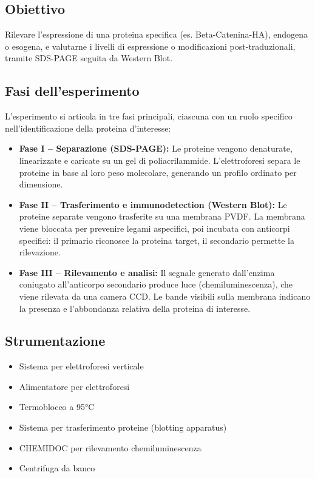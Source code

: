 \subsection{Obiettivo}
Rilevare l'espressione di una proteina specifica (es. Beta-Catenina-HA), endogena o esogena, e valutarne i livelli di espressione o modificazioni post-traduzionali, tramite SDS-PAGE seguita da Western Blot.

\subsection{Fasi dell’esperimento}

L’esperimento si articola in tre fasi principali, ciascuna con un ruolo specifico nell’identificazione della proteina d’interesse:

\begin{itemize}
  \item \textbf{Fase I – Separazione (SDS-PAGE):}  
  Le proteine vengono denaturate, linearizzate e caricate su un gel di poliacrilammide. L’elettroforesi separa le proteine in base al loro peso molecolare, generando un profilo ordinato per dimensione.

  \item \textbf{Fase II – Trasferimento e immunodetection (Western Blot):}  
  Le proteine separate vengono trasferite su una membrana PVDF. La membrana viene bloccata per prevenire legami aspecifici, poi incubata con anticorpi specifici: il primario riconosce la proteina target, il secondario permette la rilevazione.

  \item \textbf{Fase III – Rilevamento e analisi:}  
  Il segnale generato dall’enzima coniugato all’anticorpo secondario produce luce (chemiluminescenza), che viene rilevata da una camera CCD. Le bande visibili sulla membrana indicano la presenza e l’abbondanza relativa della proteina di interesse.
\end{itemize}

\newpage
\subsection{Strumentazione}
\begin{itemize}
  \item Sistema per elettroforesi verticale
  \item Alimentatore per elettroforesi
  \item Termoblocco a 95°C
  \item Sistema per trasferimento proteine (blotting apparatus)
  \item CHEMIDOC per rilevamento chemiluminescenza
  \item Centrifuga da banco
\end{itemize}

